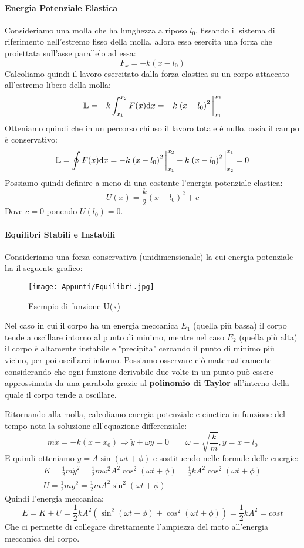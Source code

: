 \documentclass{article}
\newcommand{\then}{\ensuremath{\Rightarrow}}
\begin{document}
\paragraph{Energia Potenziale Elastica}
Consideriamo una molla che ha lunghezza a riposo $l_0$, fissando il sistema di riferimento nell'estremo fisso della molla, allora essa esercita una forza che proiettata sull'asse parallelo ad essa:
\[F_x=-k(x-l_0)\]
Calcoliamo quindi il lavoro esercitato dalla forza elastica su un corpo attaccato all'estremo libero della molla:
\[\mathbb{L}=-k\int_{x_1}^{x_2}F(x)\dd x=-k\eval{\left(x-l_0\right)^2}_{x_1}^{x_2}\]
Otteniamo quindi che in un percorso chiuso il lavoro totale è nullo, ossia il campo è conservativo:
\[\mathbb{L}=\oint F(x)\dd x=-k\eval{\left(x-l_0\right)^2}_{x_1}^{x_2}-k\eval{\left(x-l_0\right)^2}_{x_2}^{x_1}=0\]
Possiamo quindi definire a meno di una costante l'energia potenziale elastica:
\[U(x)=\frac{k}{2}(x-l_0)^2+c\]
Dove $c=0$ ponendo $U(l_0)=0$.

\paragraph{Equilibri Stabili e Instabili}
Consideriamo una forza conservativa (unidimensionale) la cui energia potenziale ha il seguente grafico:
\begin{figure}[H]
    \centering
    \texttt{[image: Appunti/Equilibri.jpg]}
    \caption{Esempio di funzione U(x)}
    \label{equilibrienergiapotenziale}
\end{figure}

Nel caso in cui il corpo ha un energia meccanica $E_1$ (quella più bassa) il corpo tende a oscillare intorno al punto di minimo, mentre nel caso $E_2$ (quella più alta) il corpo è altamente instabile e "precipita" cercando il punto di minimo più vicino, per poi oscillarci intorno. Possiamo osservare ciò matematicamente considerando che ogni funzione derivabile due volte in un punto può essere approssimata da una parabola grazie al \textbf{polinomio di Taylor} all'interno della quale il corpo tende a oscillare.

Ritornando alla molla, calcoliamo energia potenziale e cinetica in funzione del tempo nota la soluzione all'equazione differenziale:
\[m\ddot{x}=-k(x-x_0)\then \ddot{y}+\omega y=0\quad\quad \omega=\sqrt{\frac{k}{m}}, y=x-l_0\]
E quindi otteniamo $y=A\sin(\omega t+\phi)$ e sostituendo nelle formule delle energie:
\begin{align*}
    K=\frac{1}{2}m\dot{y}^2=\frac{1}{2}m\omega^2 A^2\cos^2(\omega t+\phi)=\frac{1}{2}kA^2\cos^2(\omega t+\phi)\\
    U=\frac{1}{2}my^2=\frac{1}{2}mA^2\sin^2(\omega t+\phi)
\end{align*}
Quindi l'energia meccanica:
\[E=K+U=\frac{1}{2}kA^2\left(\sin^2(\omega t+\phi)+\cos^2(\omega t+\phi)\right)=\boxed{\frac{1}{2}kA^2}=cost\]
Che ci permette di collegare direttamente l'ampiezza del moto all'energia meccanica del corpo.
\end{document}
